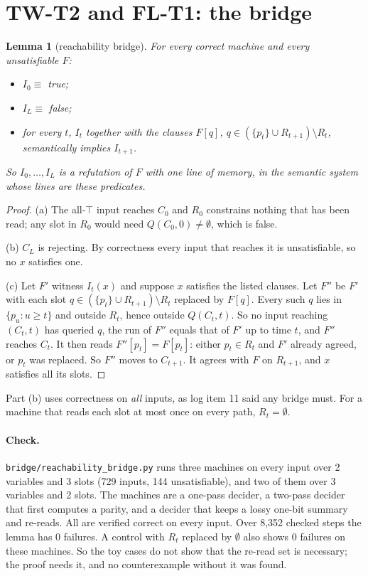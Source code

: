 \documentclass[11pt]{article}
\newtheorem{lemma}[theorem]{Lemma}
\begin{document}
\section{TW-T2 and FL-T1: the bridge}
\begin{lemma}[reachability bridge]\label{lem:reach}
For every correct machine and every unsatisfiable $F$:
\begin{itemize}
\item[(a)] $I_0\equiv$ true;
\item[(b)] $I_L\equiv$ false;
\item[(c)] for every $t$, $I_t$ together with the clauses $F[q]$, $q\in(\{p_t\}\cup R_{t+1})\setminus R_t$, semantically implies $I_{t+1}$.
\end{itemize}
So $I_0,\dots,I_L$ is a refutation of $F$ with one line of memory, in the semantic system whose lines are these predicates.
\end{lemma}
\begin{proof}
(a) The all-$\top$ input reaches $C_0$ and $R_0$ constrains nothing that has been read; any slot in $R_0$ would need $Q(C_0,0)\ne\emptyset$, which is false.

(b) $C_L$ is rejecting. By correctness every input that reaches it is unsatisfiable, so no $x$ satisfies one.

(c) Let $F'$ witness $I_t(x)$ and suppose $x$ satisfies the listed clauses. Let $F''$ be $F'$ with each slot $q\in(\{p_t\}\cup R_{t+1})\setminus R_t$ replaced by $F[q]$. Every such $q$ lies in $\{p_u:u\ge t\}$ and outside $R_t$, hence outside $Q(C_t,t)$. So no input reaching $(C_t,t)$ has queried $q$, the run of $F''$ equals that of $F'$ up to time $t$, and $F''$ reaches $C_t$. It then reads $F''[p_t]=F[p_t]$: either $p_t\in R_t$ and $F'$ already agreed, or $p_t$ was replaced. So $F''$ moves to $C_{t+1}$. It agrees with $F$ on $R_{t+1}$, and $x$ satisfies all its slots.
\end{proof}
Part (b) uses correctness on \emph{all} inputs, as log item 11 said any bridge must. For a machine that reads each slot at most once on every path, $R_t=\emptyset$.

\paragraph{Check.} \texttt{bridge/reachability\_bridge.py} runs three machines on every input over 2 variables and 3 slots (729 inputs, 144 unsatisfiable), and two of them over 3 variables and 2 slots. The machines are a one-pass decider, a two-pass decider that first computes a parity, and a decider that keeps a lossy one-bit summary and re-reads. All are verified correct on every input. Over 8{,}352 checked steps the lemma has 0 failures. A control with $R_t$ replaced by $\emptyset$ also shows 0 failures on these machines. So the toy cases do not show that the re-read set is necessary; the proof needs it, and no counterexample without it was found.
\end{document}
